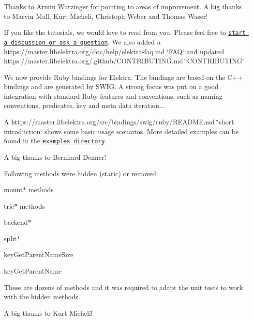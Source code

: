 Thanks to Armin Wurzinger for pointing to areas of improvement. A big thanks to Marvin Mall, Kurt Micheli, Christoph Weber and Thomas Waser!

If you like the tutorials, we would love to read from you. Please feel free to \href{https://git.libelektra.org/issues/new}{\tt start a discussion or ask a question}. We also added a https\+://master.libelektra.\+org/doc/help/elektra-\/faq.md \char`\"{}\+F\+A\+Q\char`\"{} and updated https\+://master.libelektra.\+org/.github/\+C\+O\+N\+T\+R\+I\+B\+U\+T\+I\+N\+G.\+md \char`\"{}\+C\+O\+N\+T\+R\+I\+B\+U\+T\+I\+N\+G\char`\"{}

We now provide Ruby bindings for Elektra. The bindings are based on the C++ bindings and are generated by S\+W\+IG. A strong focus was put on a good integration with standard Ruby features and conventions, such as naming conventions, predicates, key and meta data iteration...

A https\+://master.libelektra.\+org/src/bindings/swig/ruby/\+R\+E\+A\+D\+ME.md \char`\"{}short introduction\char`\"{} shows some basic usage scenarios. More detailed examples can be found in the \href{https://master.libelektra.org/src/bindings/swig/ruby/examples}{\tt examples directory}.

A big thanks to Bernhard Denner!

Following methods were hidden ({\ttfamily static}) or removed\+:


\begin{DoxyItemize}
\item {\ttfamily mount$\ast$} methods
\item {\ttfamily trie$\ast$} methods
\item {\ttfamily backend$\ast$}
\item {\ttfamily split$\ast$}
\item {\ttfamily key\+Get\+Parent\+Name\+Size}
\item {\ttfamily key\+Get\+Parent\+Name}
\end{DoxyItemize}

These are dozens of methods and it was required to adapt the unit tests to work with the hidden methods.

A big thanks to Kurt Micheli!


